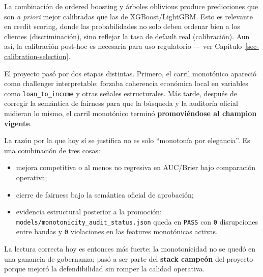 \documentclass[
  spanish,
  11pt,
  letterpaper,
]{scrbook}
\providecommand{\tightlist}{%
  \setlength{\itemsep}{0pt}\setlength{\parskip}{0pt}}
\theoremstyle{plain}
\theoremstyle{remark}
\begin{document}
\begin{tcolorbox}[enhanced jigsaw, arc=.35mm, bottomrule=.15mm, bottomtitle=1mm, breakable, colback=white, colbacktitle=quarto-callout-tip-color!10!white, colframe=quarto-callout-tip-color-frame, coltitle=black, left=2mm, leftrule=.75mm, opacityback=0, opacitybacktitle=0.6, rightrule=.15mm, title=\textcolor{quarto-callout-tip-color}{\faLightbulb}\hspace{0.5em}{Calibración out-of-box}, titlerule=0mm, toprule=.15mm, toptitle=1mm]

La combinación de ordered boosting y árboles oblivious produce
predicciones que son \emph{a priori} mejor calibradas que las de
XGBoost/LightGBM. Esto es relevante en credit scoring, donde las
probabilidades no solo deben ordenar bien a los clientes
(discriminación), sino reflejar la tasa de default real (calibración).
Aun así, la calibración post-hoc es necesaria para uso regulatorio ---
ver Capítulo~\ref{sec-calibration-selection}.

\end{tcolorbox}

\begin{tcolorbox}[enhanced jigsaw, arc=.35mm, bottomrule=.15mm, bottomtitle=1mm, breakable, colback=white, colbacktitle=quarto-callout-note-color!10!white, colframe=quarto-callout-note-color-frame, coltitle=black, left=2mm, leftrule=.75mm, opacityback=0, opacitybacktitle=0.6, rightrule=.15mm, title=\textcolor{quarto-callout-note-color}{\faInfo}\hspace{0.5em}{Monotonic constraints: de challenger interpretable a champion vigente}, titlerule=0mm, toprule=.15mm, toptitle=1mm]

El proyecto pasó por dos etapas distintas. Primero, el carril monotónico
apareció como challenger interpretable: forzaba coherencia económica
local en variables como \texttt{loan\_to\_income} y otras señales
estructurales. Más tarde, después de corregir la semántica de fairness
para que la búsqueda y la auditoría oficial midieran lo mismo, el carril
monotónico terminó \textbf{promoviéndose al champion vigente}.

La razón por la que hoy sí se justifica no es solo ``monotonía por
elegancia''. Es una combinación de tres cosas:

\begin{itemize}
\tightlist
\item
  mejora competitiva o al menos no regresiva en AUC/Brier bajo
  comparación operativa;
\item
  cierre de fairness bajo la semántica oficial de aprobación;
\item
  evidencia estructural posterior a la promoción:
  \texttt{models/monotonicity\_audit\_status.json} queda en
  \texttt{PASS} con \texttt{0} disrupciones entre bandas y \texttt{0}
  violaciones en las features monotónicas activas.
\end{itemize}

La lectura correcta hoy es entonces más fuerte: la monotonicidad no se
quedó en una ganancia de gobernanza; pasó a ser parte del \textbf{stack
campeón} del proyecto porque mejoró la defendibilidad sin romper la
calidad operativa.

\end{tcolorbox}
\end{document}
